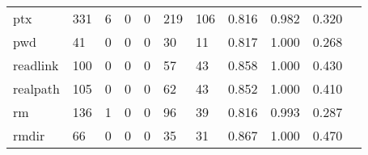 \begin{longtable}{lp{1.2cm}p{1.2cm}p{1.2cm}p{1.2cm}p{1.2cm}p{1.2cm}p{1.2cm}p{1.2cm}p{1.2cm}p{1.2cm}}
ptx       &                                   331 &                                                  6 &                                                  0 &                                                  0 &                                                219 &                                                106 &                                         0.816 &                                              0.982 &                                              0.320 \\
pwd       &                                    41 &                                                  0 &                                                  0 &                                                  0 &                                                 30 &                                                 11 &                                         0.817 &                                              1.000 &                                              0.268 \\
readlink  &                                   100 &                                                  0 &                                                  0 &                                                  0 &                                                 57 &                                                 43 &                                         0.858 &                                              1.000 &                                              0.430 \\
realpath  &                                   105 &                                                  0 &                                                  0 &                                                  0 &                                                 62 &                                                 43 &                                         0.852 &                                              1.000 &                                              0.410 \\
rm        &                                   136 &                                                  1 &                                                  0 &                                                  0 &                                                 96 &                                                 39 &                                         0.816 &                                              0.993 &                                              0.287 \\
rmdir     &                                    66 &                                                  0 &                                                  0 &                                                  0 &                                                 35 &                                                 31 &                                         0.867 &                                              1.000 &                                              0.470 \\

\end{longtable}

